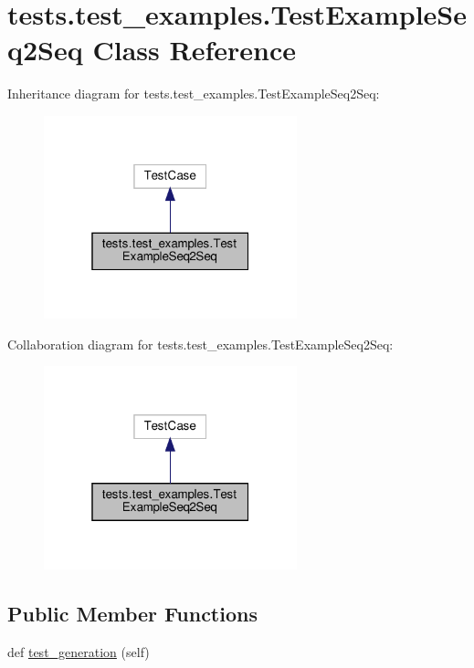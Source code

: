 \hypertarget{classtests_1_1test__examples_1_1TestExampleSeq2Seq}{}\section{tests.\+test\+\_\+examples.\+Test\+Example\+Seq2\+Seq Class Reference}
\label{classtests_1_1test__examples_1_1TestExampleSeq2Seq}


Inheritance diagram for tests.\+test\+\_\+examples.\+Test\+Example\+Seq2\+Seq\+:
\nopagebreak
\begin{figure}[H]
\begin{center}
\leavevmode
\includegraphics[width=208pt]{da/dd4/classtests_1_1test__examples_1_1TestExampleSeq2Seq__inherit__graph}
\end{center}
\end{figure}


Collaboration diagram for tests.\+test\+\_\+examples.\+Test\+Example\+Seq2\+Seq\+:
\nopagebreak
\begin{figure}[H]
\begin{center}
\leavevmode
\includegraphics[width=208pt]{d9/d86/classtests_1_1test__examples_1_1TestExampleSeq2Seq__coll__graph}
\end{center}
\end{figure}
\subsection*{Public Member Functions}
\begin{DoxyCompactItemize}
\item 
def \hyperlink{classtests_1_1test__examples_1_1TestExampleSeq2Seq_a288b619db2ba3d957b8afff63143baba}{test\+\_\+generation} (self)
\end{DoxyCompactItemize}
